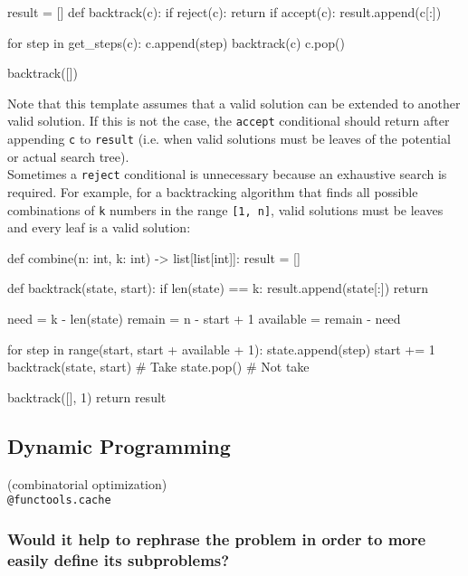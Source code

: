\documentclass[12pt, titlepage]{article}
\begin{document}
\begin{python}
result = []
def backtrack(c):
    if reject(c):
        return
    if accept(c):
        result.append(c[:])

    for step in get_steps(c):
        c.append(step)
        backtrack(c)
        c.pop()

backtrack([])
\end{python} \medskip

Note that this template assumes that a valid solution can be extended to another valid solution. If this is not the case, the \texttt{accept} conditional should return after appending \texttt{c} to \texttt{result} (i.e. when valid solutions must be leaves of the potential or actual search tree). \\

Sometimes a \texttt{reject} conditional is unnecessary because an exhaustive search is required. For example, for a backtracking algorithm that finds all possible combinations of \texttt{k} numbers in the range \texttt{[1, n]}, valid solutions must be leaves and every leaf is a valid solution: \medskip

\begin{python}
def combine(n: int, k: int) -> list[list[int]]:
    result = []

    def backtrack(state, start):
        if len(state) == k:
            result.append(state[:])
            return
       
        need = k - len(state)
        remain = n - start + 1
        available = remain - need

        for step in range(start, start + available + 1):
            state.append(step)
            start += 1
            backtrack(state, start)  # Take
            state.pop()  # Not take

    backtrack([], 1)
    return result
\end{python}

\subsection{Dynamic Programming}

(combinatorial optimization) \\
\texttt{@functools.cache}

\subsubsection{Would it help to rephrase the problem in order to more easily define its subproblems?}
\end{document}
